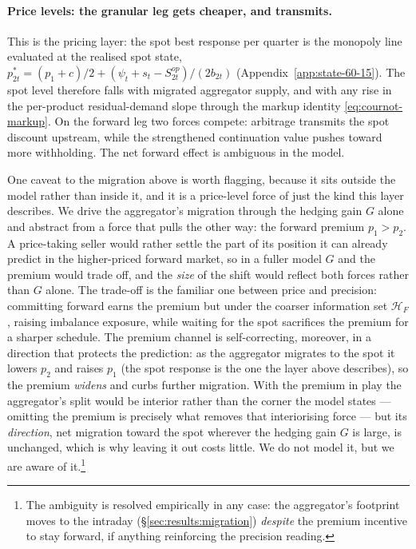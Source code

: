 \documentclass[11pt,a4paper]{article}
\theoremstyle{definition}
\theoremstyle{remark}
\theoremstyle{plain}
\begin{document}
\paragraph{Price levels: the granular leg gets cheaper, and transmits.} This is the pricing layer: the spot best response per quarter is the monopoly line evaluated at the realised spot state, $p_{2t}^* = (p_1 + c)/2 + (\psi_t + s_t - S^{op}_{2t})/(2 b_{2t})$ (Appendix~\ref{app:state-60-15}). The spot level therefore falls with migrated aggregator supply, and with any rise in the per-product residual-demand slope through the markup identity \eqref{eq:cournot-markup}. On the forward leg two forces compete: arbitrage transmits the spot discount upstream, while the strengthened continuation value pushes toward more withholding. The net forward effect is ambiguous in the model.

One caveat to the migration above is worth flagging, because it sits outside the model rather than inside it, and it is a price-level force of just the kind this layer describes. We drive the aggregator's migration through the hedging gain $G$ alone and abstract from a force that pulls the other way: the forward premium $p_1 > p_2$. A price-taking seller would rather settle the part of its position it can already predict in the higher-priced forward market, so in a fuller model $G$ and the premium would trade off, and the \emph{size} of the shift would reflect both forces rather than $G$ alone. The trade-off is the familiar one between price and precision: committing forward earns the premium but under the coarser information set $\mathcal{H}_F$, raising imbalance exposure, while waiting for the spot sacrifices the premium for a sharper schedule. The premium channel is self-correcting, moreover, in a direction that protects the prediction: as the aggregator migrates to the spot it lowers $p_2$ and raises $p_1$ (the spot response is the one the layer above describes), so the premium \emph{widens} and curbs further migration. With the premium in play the aggregator's split would be interior rather than the corner the model states --- omitting the premium is precisely what removes that interiorising force --- but its \emph{direction}, net migration toward the spot wherever the hedging gain $G$ is large, is unchanged, which is why leaving it out costs little. We do not model it, but we are aware of it.\footnote{The ambiguity is resolved empirically in any case: the aggregator's footprint moves to the intraday (\S\ref{sec:results:migration}) \emph{despite} the premium incentive to stay forward, if anything reinforcing the precision reading.}
\end{document}
